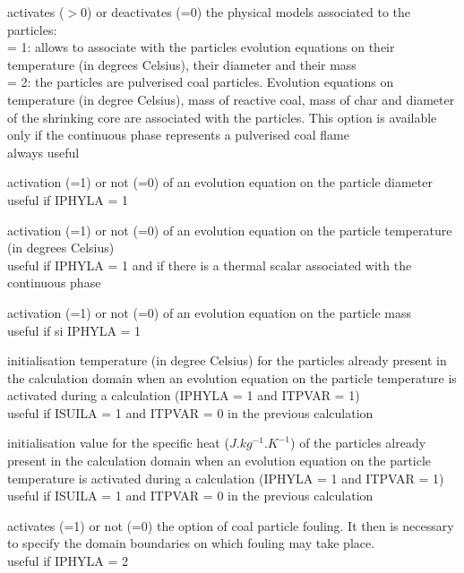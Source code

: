 {activates ($>$0) or deactivates (=0) the physical models associated to the
particles:\\
\hspace*{1.3cm} = 1: allows to associate with the particles evolution
equations on their temperature (in degrees Celsius), their diameter and
their mass\\
\hspace*{1.3cm} = 2: the particles are pulverised coal particles.
Evolution equations on temperature (in degree Celsius), mass of
reactive coal, mass of char and diameter of the shrinking core are
associated with the particles. This option is available only if the
continuous phase represents a pulverised coal flame\\
always useful}

{activation (=1) or not (=0) of an evolution equation on the particle
diameter\\
useful if IPHYLA = 1}

{activation (=1) or not (=0) of an evolution equation on the particle
temperature (in degrees Celsius)\\
useful if IPHYLA = 1 and if there is a thermal scalar associated with
the continuous phase}

{activation (=1) or not (=0) of an evolution equation on the
particle mass\\
useful if si IPHYLA = 1}

{initialisation temperature (in degree Celsius) for the particles already
present in the calculation domain when an evolution equation on
the particle temperature is activated during a calculation (IPHYLA =
1 and ITPVAR = 1)\\
useful if ISUILA = 1 and ITPVAR = 0 in the previous calculation}

{initialisation value for the specific heat ($J.kg^{-1}.K^{-1}$) of the
particles already present in the calculation domain when an evolution equation
on the particle temperature is activated during a calculation (IPHYLA =
1 and ITPVAR = 1)\\
useful if ISUILA = 1 and ITPVAR = 0 in the previous calculation}

{activates (=1) or not (=0) the option of coal particle
fouling. It then is necessary to specify the domain boundaries
on which fouling may take place.\\
useful if IPHYLA = 2}

